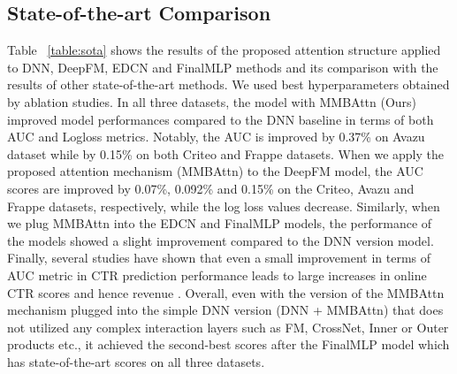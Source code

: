\documentclass{article}
\begin{document}
\subsection{State-of-the-art Comparison}

Table ~\ref{table:sota} shows the results of the proposed attention structure applied to DNN, DeepFM, EDCN and FinalMLP methods and its comparison with the results of other state-of-the-art methods. We used best hyperparameters obtained by ablation studies.
In all three datasets, the model with MMBAttn (Ours) improved model performances compared to the DNN baseline in terms of both AUC and Logloss metrics. Notably, the AUC is improved by 0.37\% on Avazu dataset while by 0.15\% on both Criteo and Frappe datasets. When we apply the proposed attention mechanism (MMBAttn) to the DeepFM model, the AUC scores are improved by 0.07\%, 0.092\% and 0.15\% on the Criteo, Avazu and Frappe datasets, respectively, while the log loss values decrease. Similarly, when we plug MMBAttn into the EDCN and FinalMLP models, the performance of the models showed a slight improvement compared to the DNN version model. Finally, several studies have shown that even a small improvement in terms of AUC metric in CTR prediction performance leads to large increases in online CTR scores and hence revenue \cite{wide&deep, ling2017ensemble, deep&cross}. Overall, even with the version of the MMBAttn mechanism plugged into the simple DNN version (DNN + MMBAttn) that does not utilized any complex interaction layers such as FM, CrossNet, Inner or Outer products etc., it achieved the second-best scores after the FinalMLP model which has state-of-the-art scores on all three datasets.
\end{document}
